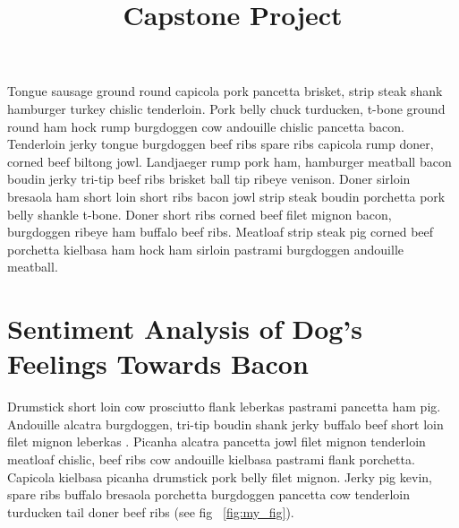 \documentclass[stu,floatsintext]{apa7}
\begin{document}
\title{Capstone Project}




\maketitle
Tongue sausage ground round capicola pork pancetta brisket, strip steak shank hamburger turkey chislic tenderloin. Pork belly chuck turducken, t-bone ground round ham hock rump burgdoggen cow andouille chislic pancetta bacon. Tenderloin jerky tongue burgdoggen beef ribs spare ribs capicola rump doner, corned beef biltong jowl. Landjaeger rump pork ham, hamburger meatball bacon boudin jerky tri-tip beef ribs brisket ball tip ribeye venison. Doner sirloin bresaola ham short loin short ribs bacon jowl strip steak boudin porchetta pork belly shankle t-bone. Doner short ribs corned beef filet mignon bacon, burgdoggen ribeye ham buffalo beef ribs. Meatloaf strip steak pig corned beef porchetta kielbasa ham hock ham sirloin pastrami burgdoggen andouille meatball.

\newpage

\section{Sentiment Analysis of Dog's Feelings Towards Bacon}

Drumstick short loin cow prosciutto flank leberkas pastrami pancetta ham pig. Andouille alcatra burgdoggen, tri-tip boudin shank jerky buffalo beef short loin \textcite{huff2010lie} filet mignon leberkas \parencite{huff2010lie}. Picanha alcatra pancetta jowl filet mignon tenderloin meatloaf chislic, beef ribs cow andouille kielbasa pastrami flank porchetta. Capicola kielbasa picanha drumstick pork belly filet mignon. Jerky pig kevin, spare ribs buffalo bresaola porchetta burgdoggen pancetta cow tenderloin turducken tail doner beef ribs (see fig ~\ref{fig:my_fig}). 
\end{document}
